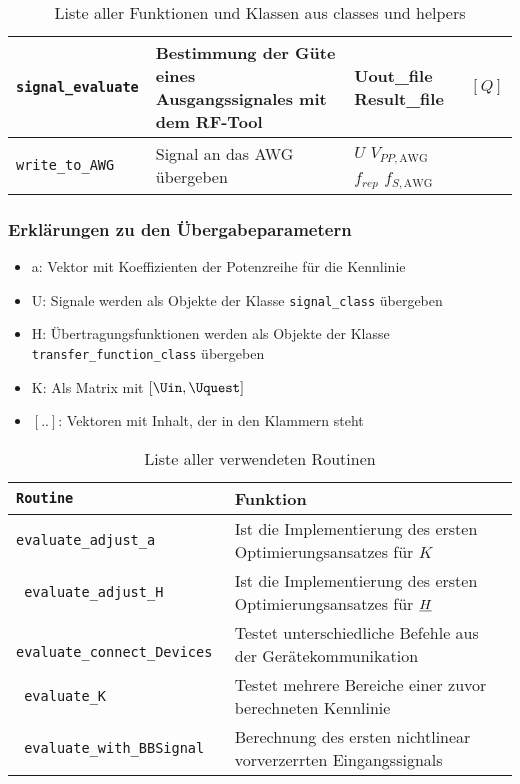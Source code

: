 \documentclass[../Report.tex]{subfiles}
\begin{document}
\begin{table}[H]
\begin{tabular}[t]{| >{\texttt\bgroup}m{3.5cm}<{\egroup}|m{8cm}|m{2cm}|m{2cm}|}
  \hline
  signal\_evaluate & Bestimmung der Güte eines Ausgangssignales mit dem RF-Tool \cite{RF-Tool} & Uout\_file \newline Result\_file & $[Q]$\\
  \hline
  write\_to\_AWG & Signal an das AWG übergeben & $U$ \newline $V_{PP,\textrm{AWG}}$ $f_{rep}$ \newline $f_{S,\textrm{AWG}}$ &  \\
  \hline
\end{tabular}
\caption{Liste aller Funktionen und Klassen aus classes und helpers}
\label{tab:anhang.Funktionen.class.helpers}
\end{table}
\subsubsection{Erklärungen zu den Übergabeparametern}
\begin{itemize}
	\item a: Vektor mit Koeffizienten der Potenzreihe für die Kennlinie
	\item U: Signale werden als Objekte der Klasse \texttt{signal\_class} übergeben
	\item H: Übertragungsfunktionen werden als Objekte der Klasse \texttt{transfer\_function\_class} übergeben
	\item K: Als Matrix mit $[\Uin, \Uquest]$
	\item $[..]$: Vektoren mit Inhalt, der in den Klammern steht
\end{itemize}
\begin{table}[H]
\centering 
\begin{tabular}[t]{| >{\texttt\bgroup}m{6cm}<{\egroup}|m{8cm}|} 
  \hline
    \textrm{\textbf{Routine}} & \textbf{Funktion} \\ 
  \hline \hline
  evaluate\_adjust\_a & Ist die Implementierung des ersten Optimierungsansatzes für $K$ \\
  \hline
  evaluate\_adjust\_H & Ist die Implementierung des ersten Optimierungsansatzes für $\underline{H}$ \\
  \hline 
  evaluate\_connect\_Devices & Testet unterschiedliche Befehle aus der Gerätekommunikation \\
  \hline
  evaluate\_K & Testet mehrere Bereiche einer zuvor berechneten Kennlinie \\
  \hline
  evaluate\_with\_BBSignal & Berechnung des ersten nichtlinear vorverzerrten Eingangssignals \\
  \hline
\end{tabular}
\caption{Liste aller verwendeten Routinen}
\label{tab:anhang.Funktionen.routine}
\end{table}
\end{document}
